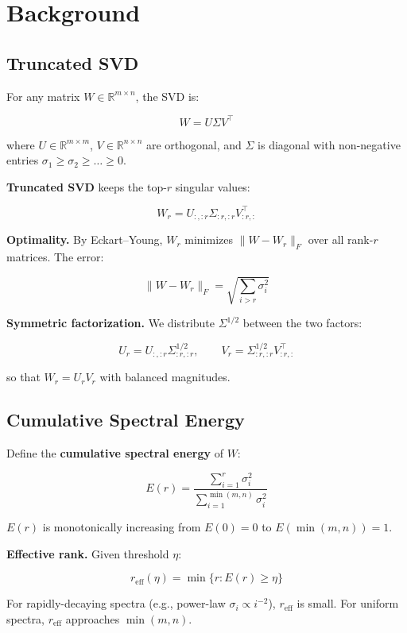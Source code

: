 
\section{Background}

\subsection{Truncated SVD}

For any matrix $W \in \mathbb{R}^{m \times n}$, the SVD is:

\[
W = U \Sigma V^\top
\tag{3.1}
\]

where $U \in \mathbb{R}^{m \times m}$, $V \in \mathbb{R}^{n \times n}$ are 
orthogonal, and $\Sigma$ is diagonal with non-negative entries 
$\sigma_1 \geq \sigma_2 \geq \dots \geq 0$.

\textbf{Truncated SVD} keeps the top-$r$ singular values:

\[
W_r = U_{:, :r} \Sigma_{:r, :r} V_{:r, :}^\top
\tag{3.2}
\]

\textbf{Optimality.} By Eckart--Young, $W_r$ minimizes $\|W - W_r\|_F$ over all 
rank-$r$ matrices. The error:

\[
\|W - W_r\|_F = \sqrt{\sum_{i > r} \sigma_i^2}
\tag{3.3}
\]

\textbf{Symmetric factorization.} We distribute $\Sigma^{1/2}$ between the two 
factors:

\[
U_r = U_{:, :r} \Sigma_{:r, :r}^{1/2}, \qquad
V_r = \Sigma_{:r, :r}^{1/2} V_{:r, :}^\top
\tag{3.4}
\]

so that $W_r = U_r V_r$ with balanced magnitudes.

\subsection{Cumulative Spectral Energy}

Define the \textbf{cumulative spectral energy} of $W$:

\[
E(r) = \frac{\sum_{i=1}^{r} \sigma_i^2}{\sum_{i=1}^{\min(m, n)} \sigma_i^2}
\tag{3.5}
\]

$E(r)$ is monotonically increasing from $E(0) = 0$ to $E(\min(m, n)) = 1$.

\textbf{Effective rank.} Given threshold $\eta$:

\[
r_\text{eff}(\eta) = \min\{r : E(r) \geq \eta\}
\tag{3.6}
\]

For rapidly-decaying spectra (e.g., power-law $\sigma_i \propto i^{-2}$), 
$r_\text{eff}$ is small. For uniform spectra, $r_\text{eff}$ approaches 
$\min(m, n)$.

